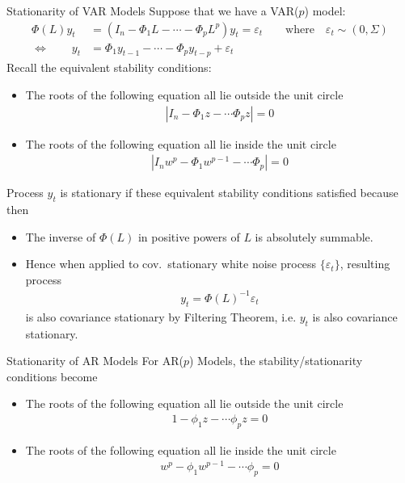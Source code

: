 \documentclass[aspectratio=169, handout]{beamer}
\begin{document}
{\scriptsize
\begin{frame}{Stationarity of VAR Models}
Suppose that we have a VAR($p$) model:
\begin{align*}
  \Phi(L)y_t
  &=
  (I_n-\Phi_1 L - \cdots - \Phi_p L^p) y_t
  =
  \varepsilon_t
  \qquad\text{where}\quad
  \varepsilon_t\sim (0,\Sigma)
  \\
  \iff\qquad
  y_t
  &=
  \Phi_1 y_{t-1} - \cdots - \Phi_p y_{t-p} + \varepsilon_t
\end{align*}
Recall the equivalent stability conditions:
\begin{itemize}
  \item The roots of the following equation all lie outside the unit
    circle
    \begin{align*}
      |I_n - \Phi_1 z - \cdots \Phi_p z| = 0
    \end{align*}

  \item The roots of the following equation all lie inside the unit
    circle
    \begin{align*}
      |I_nw^p - \Phi_1 w^{p-1} - \cdots \Phi_p| = 0
    \end{align*}
\end{itemize}
\pause
Process $y_t$ is \alert{stationary} if these equivalent
stability conditions satisfied because then
\begin{itemize}
  \item The inverse of $\Phi(L)$ in positive powers of $L$ is absolutely
    summable.
  \pause
  \item Hence when applied to cov.\ stationary white noise
    process $\{\varepsilon_t\}$, resulting process
    \begin{align*}
      y_t = \Phi(L)^{-1}\varepsilon_t
    \end{align*}
    is also \alert{covariance stationary} by Filtering Theorem,
    i.e.  $y_t$ is also covariance stationary.
\end{itemize}
\end{frame}
}


{\footnotesize
\begin{frame}{Stationarity of AR Models}
For AR($p$) Models, the stability/stationarity conditions become
\begin{itemize}
  \item The roots of the following equation all lie outside the unit
    circle
    \begin{align*}
      1 - \phi_1 z - \cdots \phi_p z = 0
    \end{align*}
  \item The roots of the following equation all lie inside the unit
    circle
    \begin{align*}
      w^p - \phi_1 w^{p-1} - \cdots \phi_p = 0
    \end{align*}
\end{itemize}
\end{frame}
}
\end{document}
